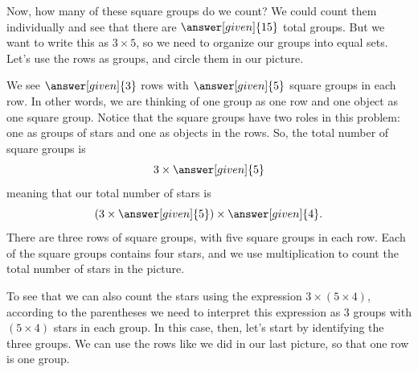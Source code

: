 \documentclass{ximera}
\begin{document}
\begin{example}
Now, how many of these square groups do we count? We could count them individually and see that there are $\answer[given]{15}$ total groups. But we want to write this as $3 \times 5$, so we need to organize our groups into equal sets. Let's use the rows as groups, and circle them in our picture.

\begin{image}
\end{image}
We see $\answer[given]{3}$ rows with $\answer[given]{5}$ square groups in each row. In other words, we are thinking of one group as one row and one object as one square group. Notice that the square groups have two roles in this problem: one as groups of stars and one as objects in the rows. So, the total number of square groups is 
\[
3 \times \answer[given]{5}
\]
meaning that our total number of stars is 
\[
\left ( 3 \times \answer[given]{5} \right ) \times \answer[given]{4}.
\]
There are three rows of square groups, with five square groups in each row. Each of the square groups contains four stars, and we use multiplication to count the total number of stars in the picture.

To see that we can also count the stars using the expression $3 \times (5 \times 4)$, according to the parentheses we need to interpret this expression as $3$ groups with $(5 \times 4)$ stars in each group. In this case, then, let's start by identifying the three groups. We can use the rows like we did in our last picture, so that one row is one group.


\end{example}
\end{document}
